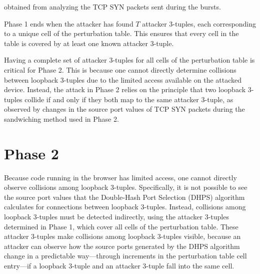 \documentclass{report}
\begin{document}
obtained from analyzing the TCP SYN packets sent during the bursts.


Phase 1 ends when the attacker has found $T$ attacker 3-tuples, each corresponding to a unique cell of the perturbation table. This ensures that every cell in the table is covered by at least one known attacker 3-tuple.


Having a complete set of attacker 3-tuples for all cells of the perturbation table is critical for Phase 2. This is because one cannot directly determine collisions between loopback 3-tuples due to the limited access available on the attacked device. Instead, the attack in Phase 2 relies on the principle that two loopback 3-tuples collide if and only if they both map to the same attacker 3-tuple, as observed by changes in the source port values of TCP SYN packets during the sandwiching method used in Phase 2.

\begin{center}
	\begin{minipage}[t]{0.5\textwidth}
		\vspace{0cm}

		
	\end{minipage}
\end{center}


\section{Phase 2}
\label{sec:phase 2}

Because code running in the browser has limited access, one cannot directly observe collisions among loopback 3-tuples. Specifically, it is not possible to see the source port values that the Double-Hash Port Selection (DHPS) algorithm calculates for connections between loopback 3-tuples. Instead, collisions among loopback 3-tuples must be detected indirectly, using the attacker 3-tuples determined in Phase 1, which cover all cells of the perturbation table. These attacker 3-tuples make collisions among loopback 3-tuples visible, because an attacker can observe how the source ports generated by the DHPS algorithm change in a predictable way—through increments in the perturbation table cell entry—if a loopback 3-tuple and an attacker 3-tuple fall into the same cell.
\end{document}
